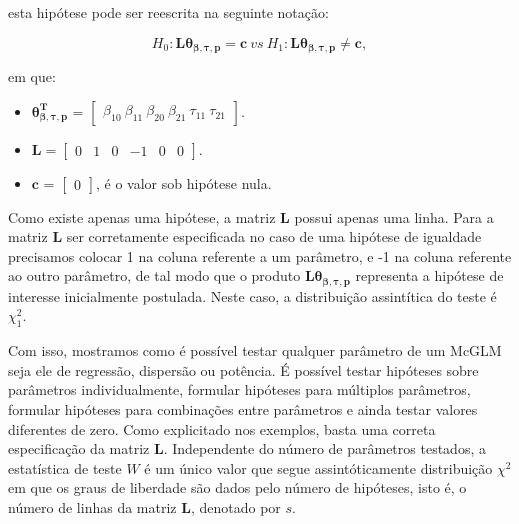 \noindent esta hipótese pode ser reescrita na seguinte notação:

$$H_0: \boldsymbol{L}\boldsymbol{\theta_{\beta,\tau,p}} = \boldsymbol{c} \ vs \ H_1: \boldsymbol{L}\boldsymbol{\theta_{\beta,\tau,p}} \neq \boldsymbol{c},$$ 

\noindent em que:

\begin{itemize}
  
  \item $\boldsymbol{\theta_{\beta,\tau,p}^T}$ = $\begin{bmatrix} \beta_{10} \  \beta_{11} \ \beta_{20} \ \beta_{21} \ \tau_{11} \ \tau_{21} \end{bmatrix}$.


\item $\boldsymbol{L} = \begin{bmatrix} 0 & 1 & 0 & -1 & 0 & 0  \end{bmatrix}.$
 
\item $\boldsymbol{c}$ = $\begin{bmatrix} 0 \end{bmatrix}$, é o valor sob hipótese nula. 

\end{itemize}

Como existe apenas uma hipótese, a matriz $\boldsymbol{L}$ possui apenas uma linha. Para a matriz $\boldsymbol{L}$ ser corretamente especificada no caso de uma hipótese de igualdade precisamos colocar 1 na coluna referente a um parâmetro, e -1 na coluna referente ao outro parâmetro, de tal modo que o produto $\boldsymbol{L}\boldsymbol{\theta_{\beta,\tau,p}}$ representa a hipótese de interesse inicialmente postulada. Neste caso, a distribuição assintítica do teste é $\chi^2_1$.

Com isso, mostramos como é possível testar qualquer parâmetro de um McGLM seja ele de regressão, dispersão ou potência. É possível testar hipóteses sobre parâmetros individualmente, formular hipóteses para múltiplos parâmetros, formular hipóteses para combinações entre parâmetros e ainda testar valores diferentes de zero. Como explicitado nos exemplos, basta uma correta especificação da matriz $\boldsymbol{L}$. Independente do número de parâmetros testados, a estatística de teste $W$ é um único valor que segue assintóticamente distribuição $\chi^2$ em que os graus de liberdade são dados pelo número de hipóteses, isto é, o número de linhas da matriz $\boldsymbol{L}$, denotado por $s$.

